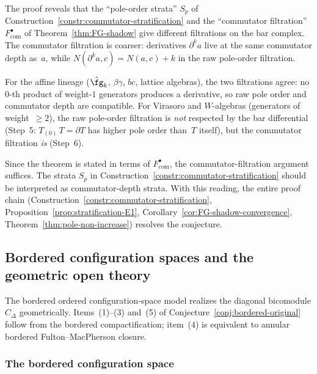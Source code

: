 \begin{remark}
\label{rem:virasoro-pole-subtlety}
The proof reveals that the ``pole-order strata'' $S_p$ of
Construction~\ref{constr:commutator-stratification} and the
``commutator filtration'' $F_{\mathrm{com}}^\bullet$ of
Theorem~\ref{thm:FG-shadow} give different filtrations on the bar complex.
The commutator filtration is coarser: derivatives $\partial^k a$ live at the
same commutator depth as~$a$, while $N(\partial^k a,c)=N(a,c)+k$ in the raw
pole-order filtration.

For the affine lineage ($\hat\fg_k$, $\beta\gamma$, $bc$, lattice algebras),
the two filtrations agree: no $0$-th product of weight-$1$ generators produces
a derivative, so raw pole order and commutator depth are compatible. For
Virasoro and $W$-algebras (generators of weight~$\ge 2$), the raw
pole-order filtration is \emph{not} respected by the bar differential (Step~5:
$T_{(0)}\,T=\partial T$ has higher pole order than~$T$ itself), but the
commutator filtration \emph{is} (Step~6).

Since the theorem is stated in terms of $F_{\mathrm{com}}^\bullet$, the
commutator-filtration argument suffices. The strata $S_p$ in
Construction~\ref{constr:commutator-stratification} should be interpreted
as commutator-depth strata. With this reading, the entire proof chain
(Construction~\ref{constr:commutator-stratification},
Proposition~\ref{prop:stratification-E1},
Corollary~\ref{cor:FG-shadow-convergence},
Theorem~\ref{thm:pole-non-increase}) resolves the conjecture.
\end{remark}

\subsection{Bordered configuration spaces and the geometric open theory}
\label{subsec:bordered-config}

\providecommand{\FM}{\mathrm{FM}}
\providecommand{\Conf}{\mathrm{Conf}}
\providecommand{\BM}{\mathrm{BM}}

The bordered ordered configuration-space model realizes the diagonal
bicomodule $C_\Delta$ geometrically. Items~(1)--(3) and~(5) of
Conjecture~\ref{conj:bordered-original} follow from the bordered
compactification; item~(4) is equivalent to annular bordered
Fulton--MacPherson closure.

\subsubsection{The bordered configuration space}

